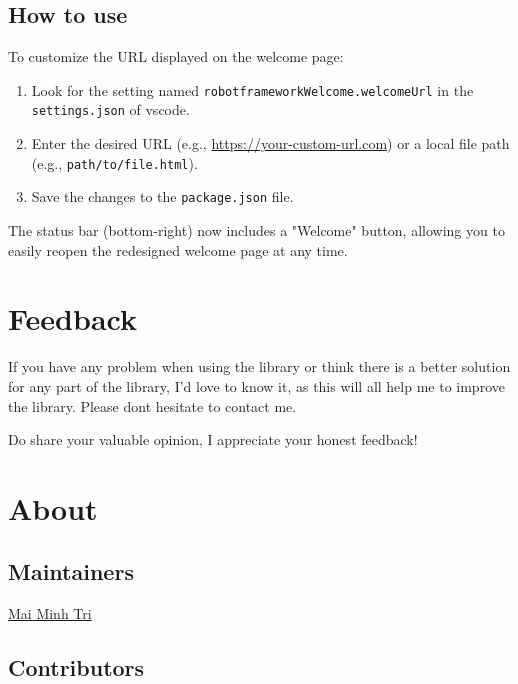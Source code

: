 \subsection{How to use}

To customize the URL displayed on the welcome page:

\begin{enumerate}
    \item Look for the setting named \texttt{robotframeworkWelcome.welcomeUrl} in the \texttt{settings.json} of vscode.
    \item Enter the desired URL (e.g., \url{https://your-custom-url.com}) or a local file path (e.g., \texttt{path/to/file.html}).
    \item Save the changes to the \texttt{package.json} file.
\end{enumerate}

The status bar (bottom-right) now includes a "Welcome" button, allowing you to easily reopen the redesigned welcome page at any time.

\hypertarget{description-feedback}{%
\section{Feedback}\label{description-feedback}}

If you have any problem when using the library or think there is a
better solution for any part of the library, I'd love to know it, as
this will all help me to improve the library. Please
don\textquotesingle t hesitate to contact me.

Do share your valuable opinion, I appreciate your honest feedback!

\hypertarget{description-about}{%
\section{About}\label{description-about}}

\hypertarget{description-maintainers}{%
\subsection{Maintainers}\label{description-maintainers}}

\href{mailto:Tri.MaiMinh@vn.bosch.com}{Mai Minh Tri}

\hypertarget{description-contributors}{%
\subsection{Contributors}\label{description-contributors}}

